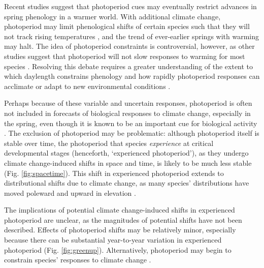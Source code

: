 \documentclass{article}
\begin{document}
\par Recent studies suggest that photoperiod cues may eventually restrict advances in spring phenology in a warmer world. With additional climate change, photoperiod may limit phenological shifts of certain species such that they will not track rising temperatures \citep{fu2015,way2015,Basler:2012,koerner2010a}, and the trend of ever-earlier springs with warming may halt. The idea of photoperiod constraints is controversial, however, as other studies suggest that photoperiod will not slow responses to warming for most species \citep{chuine2010,zohner2016}. Resolving this debate requires a greater understanding of the extent to which daylength constrains phenology and how rapidly photoperiod responses can acclimate or adapt to new environmental conditions \citep{grevstad2015}.

\par Perhaps because of these variable and uncertain responses, photoperiod is often not included in forecasts of biological responses to climate change, especially in the spring, even though it is known to be an important cue for biological activity \citep[but see ][]{duputie2015,grevstad2015,Caffarra:2011qf}. The exclusion of photoperiod may be problematic: although photoperiod itself is stable over time, the photoperiod that species \emph{experience} at critical developmental stages (henceforth, `experienced photoperiod'), as they undergo climate change-induced shifts in space and time, is likely to be much less stable (Fig. \ref{fig:spacetime}). This shift in experienced photoperiod extends to distributional shifts due to climate change, as many species' distributions have moved poleward and upward in elevation \citep[i.e., range shifts,][]{chen2011,harsch2009,parmesan2006,penuelas2003}. %

\par The implications of potential climate change-induced shifts in experienced photoperiod are unclear, as the magnitudes of potential shifts have not been described. Effects of photoperiod shifts may be relatively minor, especially because there can be substantial year-to-year variation in experienced photoperiod (Fig. \ref{fig:greenup}). Alternatively, photoperiod may begin to constrain species' responses to climate change \citep{fu2015,way2015,Basler:2012,koerner2010a}.
\end{document}
